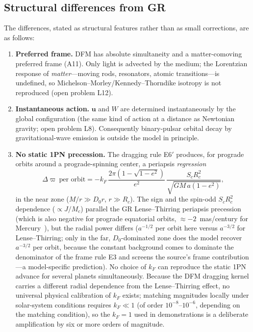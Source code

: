\documentclass[aps,reprint,amsmath,amssymb,nofootinbib,superscriptaddress,floatfix]{revtex4-2}
\newcommand{\vect}[1]{\bm{#1}}
\newcommand{\Dz}{D_0}
\begin{document}
\subsection{Structural differences from GR}
\label{sec:diff}

The differences, stated as structural features rather than as small
corrections, are as follows:

\begin{enumerate}
\item {\bf Preferred frame.}
DFM has absolute simultaneity and a matter-comoving preferred frame
(A11).
Only light is advected by the medium; the Lorentzian response of
\emph{matter}---moving rods, resonators, atomic transitions---is
undefined, so Michelson--Morley/Kennedy--Thorndike isotropy is not
reproduced (open problem L12).

\item {\bf Instantaneous action.}
$\vect{u}$ and $W$ are determined instantaneously by the global
configuration (the same kind of action at a distance as Newtonian
gravity; open problem L8).
Consequently binary-pulsar orbital decay by gravitational-wave
emission is outside the model in principle.

\item {\bf No static 1PN precession.}
The dragging rule E6$'$ produces, for prograde orbits around a
prograde-spinning center, a periapsis \emph{regression}
\begin{equation}
\Delta\varpi\ \text{per orbit}
 = -k_F\,\frac{2\pi\left(1-\sqrt{1-e^2}\right)}{e^2}\,
 \frac{S_cR_c^2}{\sqrt{GM\,a(1-e^2)}},
\label{eq:prec}
\end{equation}
in the near zone ($M/r \gg \Dz r$, $r \gg R_c$).
The sign and the spin-odd $S_cR_c^2$ dependence ($\propto J/M_c$)
parallel the GR Lense--Thirring periapsis precession (which is also
negative for
prograde equatorial orbits, $\approx -2$~mas/century for
Mercury~\cite{IorioMercury2011,IorioEtAl2011}), but the radial power differs
($a^{-1/2}$ per orbit here versus $a^{-3/2}$ for Lense--Thirring;
only in the far, $\Dz$-dominated zone does the model recover
$a^{-3/2}$ per orbit, because the constant background comes to
dominate the denominator of the frame rule E3 and screens the
source's frame contribution---a
model-specific prediction).
No choice of $k_F$ can reproduce the static 1PN advance for several
planets simultaneously.
Because the DFM dragging kernel carries a different radial dependence
from the Lense--Thirring effect, no universal physical calibration of
$k_F$ exists; matching magnitudes locally under solar-system
conditions requires $k_F \ll 1$ (of order $10^{-8}$--$10^{-6}$,
depending on the matching condition), so the $k_F = 1$ used in
demonstrations is a deliberate amplification by six or more orders of
magnitude.
\end{enumerate}
\end{document}
